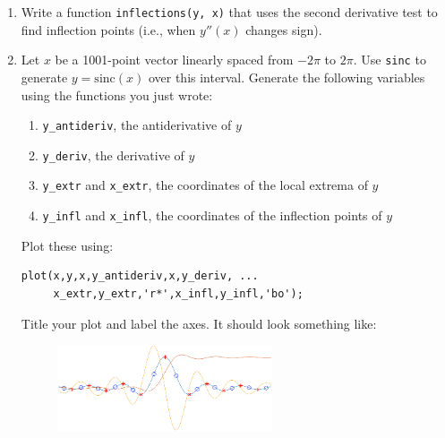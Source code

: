 \documentclass{article}
\begin{document}
\begin{enumerate}
\begin{enumerate}
			\item Write a function \lstinline|inflections(y, x)| that uses the second derivative test to find inflection points (i.e., when $y''(x)$ changes sign).
			
			\item Let $x$ be a 1001-point vector linearly spaced from $-2\pi$ to $2\pi$. Use \lstinline|sinc| to generate $y=\text{sinc}(x)$ over this interval. Generate the following variables using the functions you just wrote:
			\begin{enumerate}
				\item \lstinline|y_antideriv|, the antiderivative of $y$
				\item \lstinline|y_deriv|, the derivative of $y$
				\item \lstinline|y_extr| and \lstinline|x_extr|, the coordinates of the local extrema of $y$
				\item \lstinline|y_infl| and \lstinline|x_infl|, the coordinates of the inflection points of $y$
			\end{enumerate}
			Plot these using: \begin{lstlisting}
plot(x,y,x,y_antideriv,x,y_deriv, ...
     x_extr,y_extr,'r*',x_infl,y_infl,'bo');
			\end{lstlisting}
			Title your plot and label the axes. It should look something like:
			\begin{figure}[!h]
				\centering
				\includegraphics[width=2.5in]{result.png}
			\end{figure}
		\end{enumerate}
	\end{enumerate}
	
\end{document}
